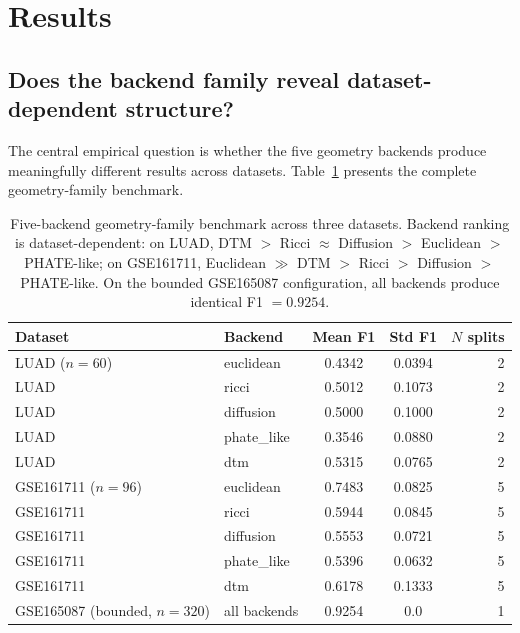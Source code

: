 \documentclass[11pt]{article}
\begin{document}
\section{Results}
\label{sec:results}

\subsection{Does the backend family reveal dataset-dependent structure?}

The central empirical question is whether the five geometry backends produce meaningfully different results across datasets.
Table~\ref{tab:geobench} presents the complete geometry-family benchmark.

\begin{table}[h]
\centering
\small
\begin{tabular}{llccr}
\toprule
Dataset & Backend & Mean F1 & Std F1 & $N$ splits \\
\midrule
LUAD ($n=60$) & euclidean & 0.4342 & 0.0394 & 2 \\
LUAD & ricci & 0.5012 & 0.1073 & 2 \\
LUAD & diffusion & 0.5000 & 0.1000 & 2 \\
LUAD & phate\_like & 0.3546 & 0.0880 & 2 \\
LUAD & dtm & 0.5315 & 0.0765 & 2 \\
\midrule
GSE161711 ($n=96$) & euclidean & 0.7483 & 0.0825 & 5 \\
GSE161711 & ricci & 0.5944 & 0.0845 & 5 \\
GSE161711 & diffusion & 0.5553 & 0.0721 & 5 \\
GSE161711 & phate\_like & 0.5396 & 0.0632 & 5 \\
GSE161711 & dtm & 0.6178 & 0.1333 & 5 \\
\midrule
GSE165087 (bounded, $n=320$) & all backends & 0.9254 & 0.0 & 1 \\
\bottomrule
\end{tabular}
\caption{Five-backend geometry-family benchmark across three datasets.
Backend ranking is dataset-dependent: on LUAD, DTM $>$ Ricci $\approx$ Diffusion $>$ Euclidean $>$ PHATE-like; on GSE161711, Euclidean $\gg$ DTM $>$ Ricci $>$ Diffusion $>$ PHATE-like.
On the bounded GSE165087 configuration, all backends produce identical F1 $= 0.9254$.}
\label{tab:geobench}
\end{table}
\end{document}

